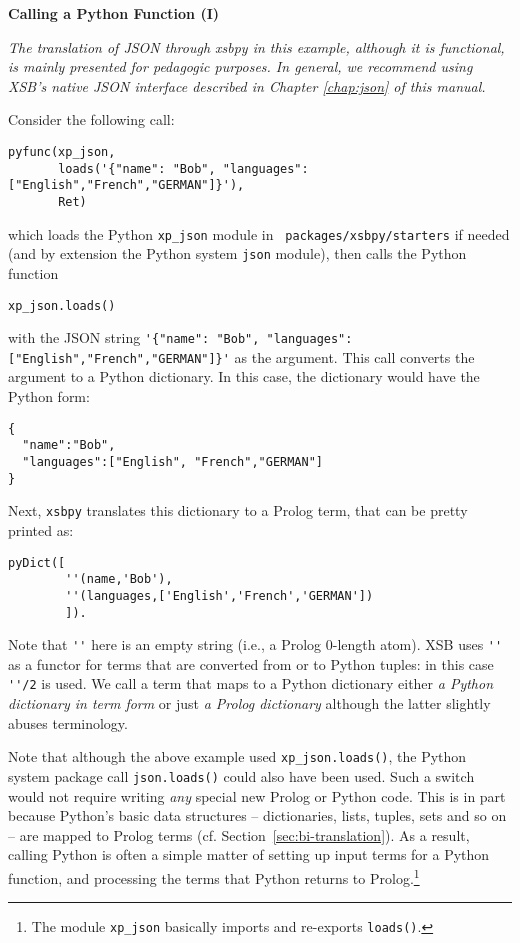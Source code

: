 \begin{example} \rm {\bf Calling a Python Function (I)} \label{ex:xsbpy-json}

  {{\em The translation of JSON through xsbpy in this example,
      although it is functional, is mainly presented for pedagogic
      purposes.  In general, we recommend using XSB's native JSON
      interface described in Chapter \ref{chap:json} of this manual.
  }}

  
\noindent  
Consider the following call:

 \begin{verbatim}
pyfunc(xp_json,
       loads('{"name": "Bob", "languages": ["English","French","GERMAN"]}'),
       Ret)
\end{verbatim}
 
\noindent 
which loads the Python {\tt xp\_json} module in {\tt
  packages/xsbpy/starters} if needed (and by extension the Python
system {\tt json} module), then calls the Python function

{\tt xp\_json.loads()}

\noindent
with the JSON string
\verb|'{"name": "Bob", "languages": ["English","French","GERMAN"]}'|
as the argument.
This call converts the argument to a Python
dictionary.  In this case, the dictionary would have the Python form:
\begin{verbatim}
{
  "name":"Bob",
  "languages":["English", "French","GERMAN"]
}
\end{verbatim}
Next,
{\tt xsbpy} translates this dictionary to a Prolog term, that can
be pretty printed as:
\begin{verbatim}
pyDict([
        ''(name,'Bob'),
        ''(languages,['English','French','GERMAN'])
        ]).
\end{verbatim}
Note that \verb|''| here is an empty string (i.e., a Prolog 0-length
atom).  XSB uses \verb|''| as a functor for terms that are converted
from or to Python tuples: in this case \verb|''/2| is used.  We call a
term that maps to a Python dictionary either {\em a Python dictionary
  in term form} or just {\em a Prolog dictionary} although the latter
slightly abuses terminology.
\end{example}

Note that although the above example used {\tt xp\_json.loads()}, the
Python system package call {\tt json.loads()} could also have been
used.  Such a switch would not require writing {\em any} special
new Prolog or Python code.  This is in part because Python's basic data
structures -- dictionaries, lists, tuples, sets and so on -- are
mapped to Prolog terms (cf. Section~\ref{sec:bi-translation}).  As a
result, calling Python is often a simple matter of setting up input
terms for a Python function, and processing the terms that Python
returns to Prolog.\footnote{The module {\tt xp\_json} basically
  imports and re-exports {\tt loads()}.}

